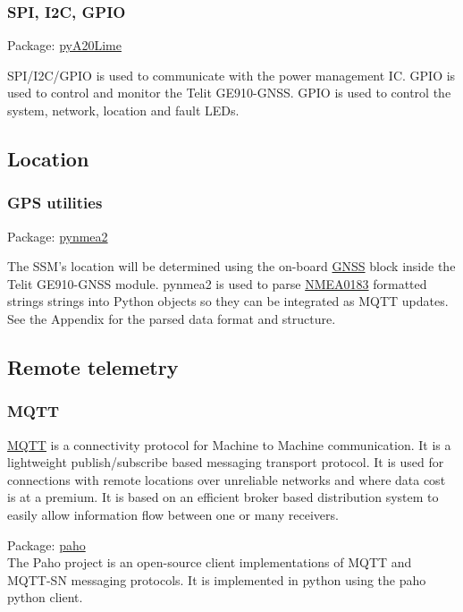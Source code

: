 \subsubsection{SPI, I2C, GPIO}
	
Package:	\href{https://pypi.python.org/pypi/pyA20Lime}{pyA20Lime}

SPI/I2C/GPIO is used to communicate with the power management IC. GPIO is used to control and monitor the Telit GE910-GNSS. GPIO is used to control the system, network, location and fault LEDs.

\subsection{Location}

\subsubsection{GPS utilities}

Package:	\href{https://github.com/Knio/pynmea2}{pynmea2}

The SSM's location will be determined using the on-board \href{http://egnos-portal.gsa.europa.eu/discover-egnos/about-egnos/what-gnss}{GNSS} block inside the Telit GE910-GNSS module. pynmea2 is used to parse \href{http://www.nmea.org/content/nmea_standards/nmea_0183_v_410.asp}{NMEA0183} formatted strings strings into Python objects so they can be integrated as MQTT updates. See the Appendix for the parsed data format and structure.

\subsection{Remote telemetry}

\subsubsection{MQTT}

\href{http://mqtt.org/}{MQTT} is a connectivity protocol for Machine to Machine communication. It is a lightweight publish/subscribe based messaging transport protocol. It is used for connections with remote locations over unreliable networks and where data cost is at a premium. It is based on an efficient broker based distribution system to easily allow  information flow between one or many receivers. 

Package:	\href{https://eclipse.org/paho/clients/python/}{paho}\\
The Paho project is an open-source client implementations of MQTT and MQTT-SN messaging protocols. It is implemented in python using the paho python client.



